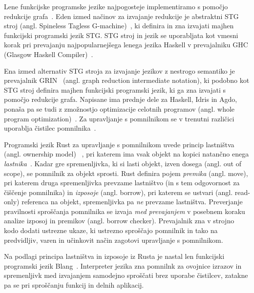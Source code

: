 \documentclass[a4paper, 12pt]{article}
\begin{document}
Lene funkcijske programske jezike najpogosteje implementiramo s pomočjo redukcije gra\-fa~\cite{peyton1987implementation}. Eden izmed načinov za izvajanje redukcije je abstraktni STG stroj (angl. Spineless Tagless G-machine)~\cite{jones1992implementing}, ki definira in zna izvajati majhen funkcijski programski jezik STG. STG stroj in jezik se uporabljata kot vmesni korak pri prevajanju najpopularnejšega lenega jezika Haskell v prevajalniku GHC (Glasgow Haskell Compiler)~\cite{GHC}.

Ena izmed alternativ STG stroja za izvajanje jezikov z nestrogo semantiko je  prevajalnik GRIN~\cite{boquist1997grin} (angl. graph reduction intermediate notation), ki podobno kot STG stroj definira majhen funkcijski programski jezik, ki ga zna izvajati s pomočjo redukcije grafa. Napisane ima prednje dele za Haskell, Idris in Agdo, ponaša pa se tudi z zmožnostjo optimizacije celotnih programov (angl. whole program optimization)~\cite{podlovics2022modern}. Za upravljanje s pomnilnikom se v trenutni različici uporablja čistilec pomnilnika~\cite{boquist1999code}.

Programski jezik Rust za upravljanje s pomnilnikom uvede princip lastništva (angl. ownership model) ~\cite{klabnik2023rust}, pri katerem ima vsak objekt na kopici natančno enega \textit{lastnika}~\cite{Jung, Oxide, StackedBorrows}. Kadar gre spremenljivka, ki si lasti objekt, izven dosega (angl. out of scope), se pomnilnik za objekt sprosti. Rust definira pojem \textit{premika} (angl. move), pri katerem druga spremenljivka prevzame lastništvo (in s tem odgovornost za čiščenje pomnilnika) in \textit{izposoje} (angl. borrow), pri katerem se ustvari (angl. read-only) referenca na objekt, spremenljivka pa \textit{ne} prevzame lastništva. Preverjanje pravilnosti sproščanja pomnilnika se izvaja \textit{med prevajanjem} v posebnem koraku analize izposoj in premikov (angl. borrow checker). Prevajalnik zna v strojno kodo dodati ustrezne ukaze, ki ustrezno sproščajo pomnilnik in tako na predvidljiv, varen in učinkovit način zagotovi upravljanje s pomnilnikom.

Na podlagi principa lastništva in izposoje iz Rusta je nastal len funkcijski programski jezik Blang~\cite{Kocjan_Turk_2022}. Interpreter jezika zna pomnilnk za ovojnice izrazov in spremenljivk med izvajanjem samodejno sproščati brez uporabe čistilcev, zatakne pa se pri sproščanju funkcij in delnih aplikacij.


\end{document}
